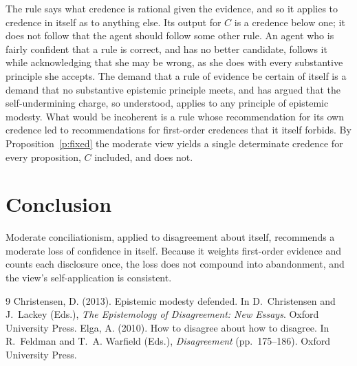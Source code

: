 \documentclass{situationist-preprint}
\begin{document}
\begin{reply}
The rule says what credence is rational given the evidence, and so it applies to credence in itself as to anything else. Its output for $C$ is a credence below one; it does not follow that the agent should follow some other rule. An agent who is fairly confident that a rule is correct, and has no better candidate, follows it while acknowledging that she may be wrong, as she does with every substantive principle she accepts. The demand that a rule of evidence be certain of itself is a demand that no substantive epistemic principle meets, and \citet{Christensen2013} has argued that the self-undermining charge, so understood, applies to any principle of epistemic modesty. What would be incoherent is a rule whose recommendation for its own credence led to recommendations for first-order credences that it itself forbids. By Proposition~\ref{p:fixed} the moderate view yields a single determinate credence for every proposition, $C$ included, and does not.
\end{reply}

\section{Conclusion}

Moderate conciliationism, applied to disagreement about itself, recommends a moderate loss of confidence in itself. Because it weights first-order evidence and counts each disclosure once, the loss does not compound into abandonment, and the view's self-application is consistent.

\begin{thebibliography}{9}\small
{} Christensen, D. (2013). Epistemic modesty defended. In D.~Christensen and J.~Lackey (Eds.), \emph{The Epistemology of Disagreement: New Essays}. Oxford University Press.
 Elga, A. (2010). How to disagree about how to disagree. In R.~Feldman and T.~A. Warfield (Eds.), \emph{Disagreement} (pp.~175--186). Oxford University Press.
\end{thebibliography}
\end{document}
